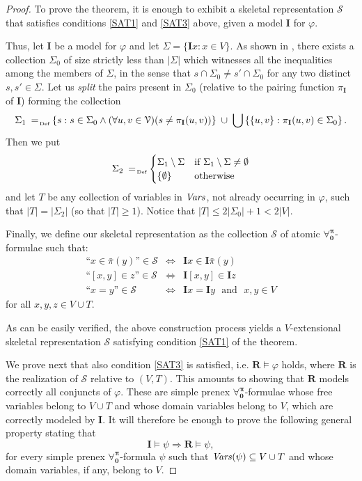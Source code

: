 \documentclass[a4paper,UKenglish]{lipics}
\newcommand{\Lang}{\ensuremath{\mathbf{\forall_{0}^{\pi}}}\xspace}
\newcommand{\nonpairs}[1]{\bar{\pi}(#1)}
\newcommand{\pairf}[1]{\ensuremath{\pi_{#1}}}
\newcommand{\inter}{\ensuremath{\mathbf{I}}\xspace}
\newcommand{\atset}{\mathcal{S}}
\newcommand{\aslit}[1]{\mbox{``}#1\mbox{''}}
\newcommand{\real}{\mathbf{R}}
\begin{document}
\begin{proof}
To prove the theorem, it is enough to exhibit a skeletal
representation $\atset$ that satisfies conditions \ref{SAT1} and
\ref{SAT3} above, given a model $\inter$ for $\varphi$.

Thus, let $\inter$ be a model for $\varphi$ and let $\Sigma = \{
\inter x : x \in V\}$.  As shown in \cite{CanFer1995}, there exists a
collection $\Sigma_0$ of size strictly less than $|\Sigma|$ which
witnesses all the inequalities among the members of $\Sigma$, in the
sense that $s \cap \Sigma_0 \neq s' \cap \Sigma_0$ for any two
distinct $s,s' \in \Sigma$.  Let us \emph{split} the pairs present in
$\Sigma_0$ (relative to the pairing function $\pairf{\inter}$ of
$\inter$) forming the collection
\[
 \Sigma_1 \defAs \{ s : s \in \Sigma_0 \wedge (\forall u,v \in
 \VNU)(s \neq \pairf{\inter}(u,v))\}\; \cup \;
 \bigcup \left\{ \{u,v\} : \pairf{\inter}(u,v) \in \Sigma_0 \right\}.
\]
Then we put
\[
 \Sigma_{2} \defAs \begin{cases}
 \Sigma_{1} \setminus \Sigma & \text{if } \Sigma_{1} \setminus \Sigma
 \neq \emptyset\\
%
 \{\emptyset\} & \text{otherwise}
 \end{cases}
\]
and let $T$ be any collection of variables in $\mathit{Vars}$, not already
occurring in $\varphi$, such that $|T|=|\Sigma_2|$ (so that $|T| \geq
1$).  Notice that $|T| \leq 2|\Sigma_0| + 1 < 2|V|$.

Finally, we define our skeletal representation as the collection
$\atset$ of atomic \Lang-formulae such that:
\[
 \begin{array}{rcl}
  \aslit{x \in \nonpairs{y}} \in \atset& \iff & \inter x \in \inter \nonpairs{y}\\
  \aslit{[x,y] \in z} \in \atset & \iff & \inter [x,y] \in \inter z\\
  \aslit{x=y} \in \atset & \iff & \inter x = \inter y \text{ ~and~ }
  x,y \in V
 \end{array}
\]
for all $x,y,z \in V \cup T$.

As can be easily verified, the above construction process yields a
$V$-extensional skeletal representation $\atset$ satisfying condition
\ref{SAT1} of the theorem.

We prove next that also condition \ref{SAT3} is satisfied, i.e. $\real
\models \varphi$ holds, where $\real$ is the realization of $\atset$
relative to $(V,T)$.  This amounts to showing that $\real$ models
correctly all conjuncts of $\varphi$.  These are simple prenex
\Lang-formulae whose free variables belong to $V \cup T$ and whose
domain variables belong to $V$, which are correctly modeled by
$\inter$.  It will therefore be enough to prove the following general
property stating that
\begin{equation}\label{SATEQ1}
\inter \models \psi  \Longrightarrow \real \models \psi,
\end{equation}
for every simple prenex \Lang-formula $\psi$ such that $\mathit{Vars}(\psi)
\subseteq V \cup T$ and whose domain variables, if any, belong to $V$.


\end{proof}
\end{document}
